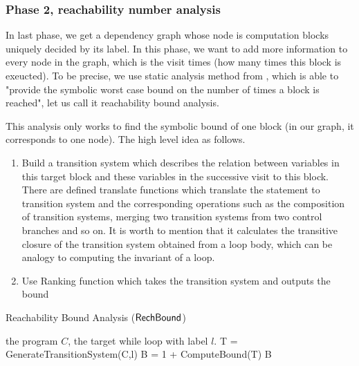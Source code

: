  

\subsubsection{Phase 2, reachability number analysis}
In last phase, we get a dependency graph whose node is computation blocks uniquely decided by its label. In this phase, we want to add more information to every node in the graph, which is the visit times (how many times this block is exeucted). To be precise, we use static analysis method from , which is able to "provide the symbolic worst case bound on the number of times a block is reached", let us call it reachability bound analysis. 

This analysis only works to find the symbolic bound of one block (in our graph, it corresponds to one node). The high level idea as follows.
\begin{enumerate}
    \item Build a transition system which describes the relation between variables in this target block and these variables in the successive visit to this block. There are defined translate functions which translate the statement to transition system and the corresponding operations such as the composition of transition systems, merging two transition systems from two control branches and so on. It is worth to mention that it calculates the transitive closure of the transition system obtained from a loop body, which can be analogy to computing the invariant of a loop.  
    \item Use Ranking function which takes the transition system and outputs the bound
\end{enumerate}

\begin{algorithm}
\caption{
{Reachability Bound Analysis ($\mathsf{RechBound}$)}
\label{alg:rb}
}
\begin{algorithmic}
\REQUIRE the program $C$, the target while loop with label $l$.
\STATE  T  = GenerateTransitionSystem(C,l) 
\STATE B = 1 + ComputeBound(T)
\RETURN B
\end{algorithmic}
\end{algorithm}

